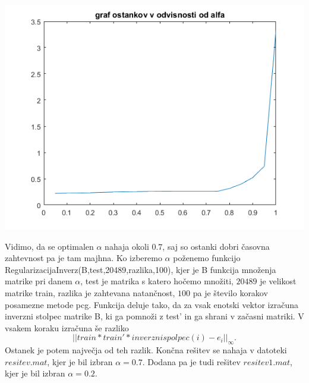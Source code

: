 \documentclass[11pt]{article} %
\begin{document}
\begin{centering}
\includegraphics[scale=0.4]{ostanek}
\end{centering}


Vidimo, da se optimalen $\alpha$ nahaja okoli $0.7$, saj so ostanki dobri časovna zahtevnost pa je tam majhna. Ko izberemo $\alpha$ poženemo funkcijo RegularizacijaInverz(B,test,20489,razlika,100), kjer je B funkcija množenja matrike pri danem $\alpha$, test je matrika s katero hočemo množiti, $20489$ je velikost matrike train, razlika je zahtevana natančnost, $100$ pa je število korakov posamezne metode pcg. Funkcija deluje tako, da za vsak enotski vektor izračuna inverzni stolpec matrike B, ki ga pomnoži z test' in ga shrani v začasni matriki. V vsakem koraku izračuna še razliko
$$||train*train'*inverznispolpec(i) - e_i||_{\infty}.$$
Ostanek je potem največja od teh razlik. Končna rešitev se nahaja v datoteki $resitev.mat$, kjer je bil izbran $\alpha=0.7$. Dodana pa je tudi rešitev $resitev1.mat$, kjer je bil izbran $\alpha=0.2$.
\end{document}
